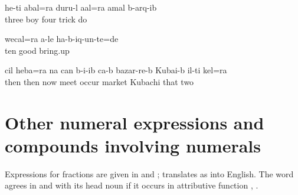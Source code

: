 \ea\label{ex:mythreechildrenallplayedtricks}
\gll	he{\uvfr}-t{\lmk}i	{\eppl}a{\pha}bal=ra	dur{\phfr}u{\pha}-l	a{\vuvfr}{\lab}al=ra	{\eppl}a{\pha}mal	b-arq{\ej}-ib\\
		three	boy	four	trick	do\\
\glt	{}
\z

\ea\label{ex:allchildrenwerebroughtupwell}
\gll	wec{\ej}al=ra	{\eppl}a{\pha}{\phfr}-le	ha-b-iq{\ej}-un-te=de\\
	ten	good	bring.up\\
\glt	{}
\z

\ea\label{ex:thenthesetwoalsometonthemarket}
\gll	c{\ej}il	heba=ra	na	can	b-i{\paaf}-ib ca-b	bazar-re-b	Kuba{\paaf}i-b	il-t{\lmk}i	k{\ej}{\lab}el=ra\\
	then	then	now	meet	occur 	market	Kubachi	that	two\\
\glt	{}
\z



\section{Other numeral expressions and compounds involving numerals}
\label{sec:othernumeralexpressions}

Expressions for fractions are given in  and ;  translates as  into English. The word   agrees in  and  with its head noun if it occurs in attributive function , .
%
\begin{exe}
	\ex	\label{ex:fractions}
		\TabPositions{12em}
			 \tab {}  \\
			 \tab {}	
\end{exe}

